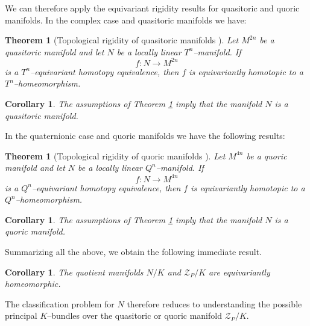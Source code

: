 \documentclass[11pt,a4paper]{article}
\numberwithin{equation}{section}
\newtheorem{thm}[definition]{Theorem}
\newtheorem{cor}[definition]{Corollary}
\theoremstyle{named}
\begin{document}
We can therefore apply the equivariant rigidity results for quasitoric and quoric manifolds. In the complex case and quasitoric manifolds we have:

\medskip

\begin{thm}[Topological rigidity of quasitoric manifolds \cite{mp}]\label{thm:top_rigidity_quasitoric}
Let $M^{2n}$ be a quasitoric manifold and let $N$ be a locally linear $T^n$--manifold. If
\[
f:N\longrightarrow M^{2n}
\]
is a $T^n$--equivariant homotopy equivalence, then $f$ is equivariantly homotopic to a $T^n$--homeomorphism.
\end{thm}

\begin{cor}\label{cor:quotient_quasitoric}
The assumptions of Theorem \ref{thm:top_rigidity_quasitoric} imply that the manifold $N$ is a quasitoric manifold.
\end{cor}

\medskip

In the quaternionic case and quoric manifolds we have the following results: 

\medskip

\begin{thm}[Topological rigidity of quoric manifolds \cite{gp}]\label{thm:top_rigidity_quoric}
Let $M^{4n}$ be a quoric manifold and let $N$ be a locally linear $Q^n$--manifold. If
\[
f:N\longrightarrow M^{4n}
\]
is a $Q^n$--equivariant homotopy equivalence, then $f$ is equivariantly homotopic to a $Q^n$--homeomorphism.
\end{thm}

\begin{cor}\label{cor:quotient_quoric}
The assumptions of Theorem \ref{thm:top_rigidity_quoric} imply that the manifold $N$ is a quoric manifold.
\end{cor}

\medskip

Summarizing all the above, we obtain the following immediate result.

\begin{cor}\label{cor:quotient_homeo}
The quotient manifolds $N/K$ and $\mathcal Z_P/K$ are equivariantly homeomorphic. 
\end{cor}

\medskip

The classification problem for $N$ therefore reduces to understanding the possible principal $K$--bundles over the quasitoric or quoric manifold $\mathcal Z_P/K$.
\end{document}
